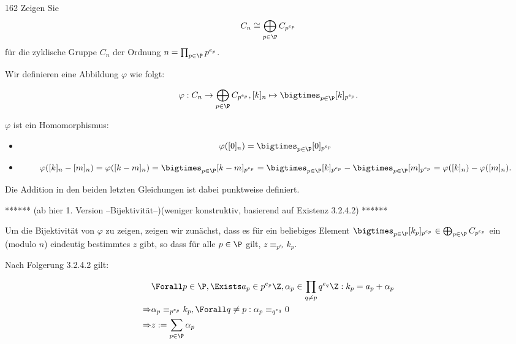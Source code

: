 \begin{algebraUE}{162}
Zeigen Sie
\begin{align*}
  C_n \cong \bigoplus_{p \in \P} C_{p^{e_p}}
\end{align*}
für die zyklische Gruppe $C_n$ der Ordnung $n = \prod_{p \in \P}p^{e_p}$.
\end{algebraUE}
\begin{solution}
Wir definieren eine Abbildung $\varphi$ wie folgt:

\begin{align*}
    \varphi: C_n \rightarrow \bigoplus_{p \in \P} C_{p^{e_p}}, [k]_n \mapsto \bigtimes_{p \in \P} [k]_{p^{e_p}}.
\end{align*}

$\varphi$ ist ein Homomorphismus:
\begin{itemize}
\item
\begin{align*}
    \varphi([0]_{n}) = \bigtimes_{p \in \P}[0]_{p^{e_p}}
    \end{align*}
\item
\begin{align*}
      \varphi([k]_n - [m]_n) = \varphi([k-m]_n) = \bigtimes_{p \in \P} [k-m]_{p^{e_p}} =
      \bigtimes_{p \in \P} [k]_{p^{e_p}} -
      \bigtimes_{p \in \P} [m]_{p^{e_p}} =
      \varphi([k]_n) - \varphi([m]_n).
\end{align*}
\end{itemize}
Die Addition in den beiden letzten Gleichungen ist dabei punktweise definiert.

****** (ab hier 1. Version --Bijektivität--)(weniger konstruktiv, basierend auf Existenz 3.2.4.2) ******

Um die Bijektivität von $\varphi$ zu zeigen, zeigen wir zunächst, dass es für ein beliebiges Element $\bigtimes_{p \in \P} [k_p]_{p^{e_p}} \in \bigoplus_{p \in \P} C_{p^{e_p}}$ ein (modulo $n$) eindeutig bestimmtes $z$ gibt, so dass für alle $p \in \P$ gilt, $z \equiv_{p^{e_{p}}} k_{p}$.

Nach Folgerung 3.2.4.2 gilt:

\begin{align*}
    & \Forall p \in \P, \Exists a_p \in p^{e_{p}} \Z, \alpha_p \in \prod_{q \neq p} q^{e_q} \Z: k_p = a_p + \alpha_p \\
    \Rightarrow & \alpha_p \equiv_{p^{e_{p}}} k_p, \Forall q \neq p: \alpha_p \equiv_{q^{e_{q}}} 0 \\
    \Rightarrow & z := \sum_{p \in \P} \alpha_p
\end{align*}


\end{solution}
